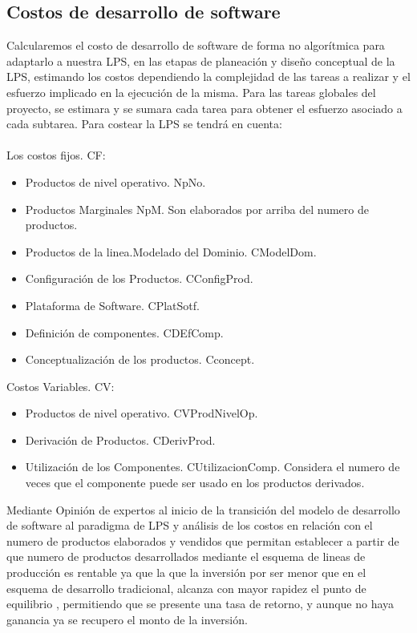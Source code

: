 \documentclass[letterpaper]{article}
\begin{document}
\subsection{\textbf{Costos de desarrollo de software }}
Calcularemos el costo de desarrollo de software de forma no algorítmica para adaptarlo a nuestra LPS, en las etapas de planeación y diseño conceptual de la LPS, estimando los costos dependiendo la complejidad de las tareas a realizar y el esfuerzo implicado en la ejecución de la misma.
Para las tareas globales del proyecto, se estimara y se sumara cada tarea para obtener el esfuerzo asociado a cada subtarea. Para costear la LPS se tendrá en cuenta:\\\\
Los costos fijos. CF:
\begin{itemize}
    \item Productos de nivel operativo. NpNo.
    \item Productos Marginales NpM. Son elaborados por arriba del numero de productos.
    \item Productos de la linea.Modelado del Dominio. CModelDom.
    \item Configuración de los Productos. CConfigProd.
    \item Plataforma de Software. CPlatSotf.
    \item Definición de componentes. CDEfComp.
    \item Conceptualización de los productos. Cconcept.\\
\end{itemize} 


Costos Variables. CV:

\begin{itemize}
    \item Productos de nivel operativo. CVProdNivelOp.
    \item Derivación de Productos. CDerivProd.
    \item Utilización de los Componentes. CUtilizacionComp. Considera el numero de veces que el componente  puede ser usado en los productos derivados.
\end{itemize}

Mediante Opinión de expertos al inicio de la transición del modelo de desarrollo de software al paradigma de LPS y análisis de los costos en relación con el numero de productos elaborados y vendidos que permitan establecer a partir de que numero de productos desarrollados mediante el esquema de lineas de producción es rentable ya  que la que la inversión por ser menor que en el esquema de desarrollo tradicional, alcanza con mayor rapidez el punto de equilibrio , permitiendo que se presente una tasa de retorno, y aunque no haya ganancia ya se recupero el monto de la inversión.  
\end{document}
